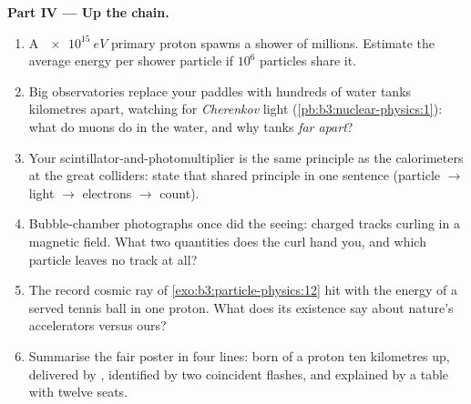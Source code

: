 \begin{problem}
\medskip\noindent\textbf{Part IV --- Up the chain.}

\begin{enumerate}[resume]
  \item A $\qty{e15}{eV}$ primary proton spawns a shower of
        millions. Estimate the average energy per shower
        particle if $10^{6}$ particles share it.
  \item Big observatories replace your paddles with hundreds of
        water tanks kilometres apart, watching for
        \emph{Cherenkov} light (\cref{pb:b3:nuclear-physics:1}):
        what do muons do in the water, and why tanks \emph{far
        apart}?
  \item Your scintillator-and-photomultiplier is the same
        principle as the calorimeters at the great colliders:
        state that shared principle in one sentence
        (particle $\to$ light $\to$ electrons $\to$ count).
  \item Bubble-chamber photographs once did the seeing: charged
        tracks curling in a magnetic field. What two quantities
        does the curl hand you, and which particle leaves no
        track at all?
  \item The record cosmic ray of
        \cref{exo:b3:particle-physics:12} hit with the energy of
        a served tennis ball in one proton. What does its
        existence say about nature's accelerators versus ours?
  \item Summarise the fair poster in four lines: born of a
        proton ten kilometres up, delivered by ,
        identified by two coincident flashes, and explained by a
        table with twelve seats.
\end{enumerate}
\end{problem}
